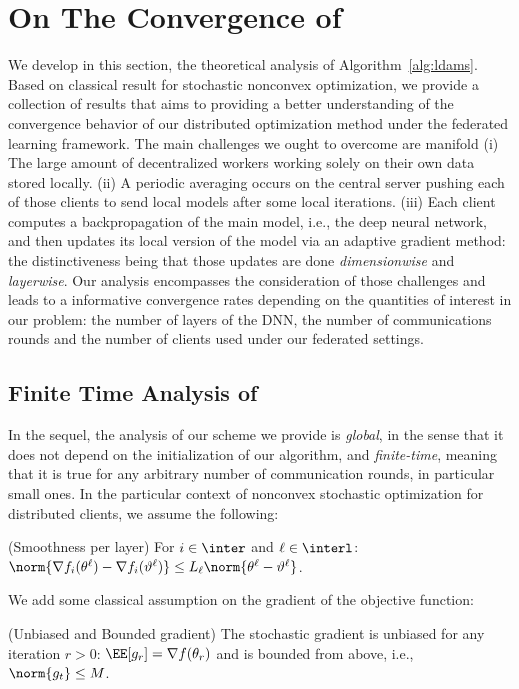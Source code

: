 \documentclass[twoside]{article}
\begin{document}
\vspace{0.2in}
\section{On The Convergence of \algo}\label{sec:theory}
We develop in this section, the theoretical analysis of Algorithm~\ref{alg:ldams}.  Based on classical result for stochastic nonconvex optimization, we provide a collection of results that aims to providing a better understanding of the convergence behavior of our distributed optimization method under the federated learning framework.
The main challenges we ought to overcome are manifold 
(i) The large amount of decentralized workers working solely on their own data stored locally. 
(ii) A periodic averaging occurs on the central server pushing each of those clients to send local models after some local iterations. 
(iii) Each client computes a backpropagation of the main model, i.e., the deep neural network, and then updates its local version of the model via an adaptive gradient method: the distinctiveness being that those updates are done \emph{dimensionwise} and \emph{layerwise}.
Our analysis encompasses the consideration of those challenges and leads to a informative convergence rates depending on the quantities of interest in our problem: the number of layers of the DNN, the number of communications rounds and the number of clients used under our federated settings.

\subsection{Finite Time Analysis of \algo}
In the sequel, the analysis of our scheme we provide is \emph{global}, in the sense that it does not depend on the initialization of our algorithm, and \emph{finite-time}, meaning that it is true for any arbitrary number of communication rounds, in particular small ones.
In the particular context of nonconvex stochastic optimization for distributed clients, we assume the following:

\vspace{0.1in}

\begin{assumption}\label{ass:smooth}(Smoothness per layer)
For $i \in \inter$ and $\ell \in \interl$: $\norm{\nabla f_i (\theta^\ell) - \nabla f_i (\vartheta^\ell)} \leq L_\ell \norm{\theta^\ell-\vartheta^\ell}$.
\end{assumption}
We add some classical assumption on the gradient of the objective function:
\begin{assumption}\label{ass:boundgrad}(Unbiased and Bounded gradient)
The stochastic gradient is unbiased for any iteration $r>0$: $\EE[g_r] = \nabla f(\theta_r)$ and is bounded from above, i.e., $\norm{g_t} \leq M$.
\end{assumption}
\end{document}
